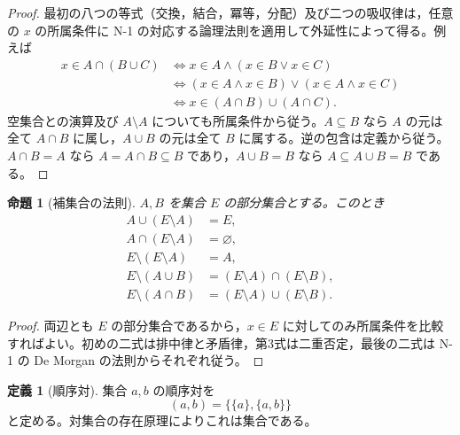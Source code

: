 \documentclass[a5paper,10pt,dvipdfmx]{jsarticle}
\theoremstyle{definition}
\newtheorem{defn}[ruledef]{定義}
\theoremstyle{plain}
\newtheorem{prop}[ruledef]{命題}
\newcommand{\iffc}{\Longleftrightarrow}
\begin{document}
\begin{proof}
最初の八つの等式（交換，結合，冪等，分配）及び二つの吸収律は，任意の $x$ の所属条件に N-1 の対応する論理法則を適用して外延性によって得る。例えば
\begin{align*}
 x\in A\cap(B\cup C)
 &\iffc x\in A\land(x\in B\lor x\in C)\\
 &\iffc (x\in A\land x\in B)\lor(x\in A\land x\in C)\\
 &\iffc x\in(A\cap B)\cup(A\cap C).
\end{align*}
空集合との演算及び $A\setminus A$ についても所属条件から従う。$A\subseteq B$ なら $A$ の元は全て $A\cap B$ に属し，$A\cup B$ の元は全て $B$ に属する。逆の包含は定義から従う。$A\cap B=A$ なら $A=A\cap B\subseteq B$ であり，$A\cup B=B$ なら $A\subseteq A\cup B=B$ である。
\end{proof}
\begin{prop}[補集合の法則]\label{k31}
$A,B$ を集合 $E$ の部分集合とする。このとき
\begin{align*}
 A\cup(E\setminus A)&=E,\\
 A\cap(E\setminus A)&=\varnothing,\\
 E\setminus(E\setminus A)&=A,\\
 E\setminus(A\cup B)&=(E\setminus A)\cap(E\setminus B),\\
 E\setminus(A\cap B)&=(E\setminus A)\cup(E\setminus B).
\end{align*}
\end{prop}
\begin{proof}
両辺とも $E$ の部分集合であるから，$x\in E$ に対してのみ所属条件を比較すればよい。初めの二式は排中律と矛盾律，第3式は二重否定，最後の二式は N-1 の De Morgan の法則からそれぞれ従う。
\end{proof}
\begin{defn}[順序対]\label{k32}
集合 $a,b$ の順序対を
\[
 (a,b)=\bigl\{\{a\},\{a,b\}\bigr\}
\]
と定める。対集合の存在原理によりこれは集合である。
\end{defn}
\end{document}
